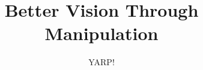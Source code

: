 \documentclass[a4]{article}
\begin{document}
 

\onecolumn



\title{Better Vision Through Manipulation}
\author{YARP!}


\maketitle\thispagestyle{empty} %

\ifdraft
  \thispagestyle{plain}
  \pagestyle{plain}
\fi























\end{document}
